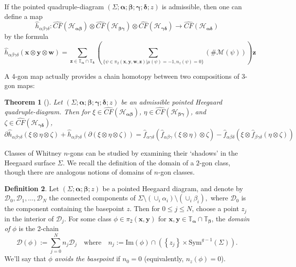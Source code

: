 \documentclass[11pt]{article}
\theoremstyle{plain} \newtheorem{thm}{Theorem}[subsection]
\theoremstyle{plain} \newtheorem{cor}[thm]{Corollary}
\theoremstyle{plain} \newtheorem{prop}[thm]{Proposition}
\theoremstyle{plain} \newtheorem{conj}[thm]{Conjecture}
\theoremstyle{plain} \newtheorem{lem}[thm]{Lemma}
\theoremstyle{definition} \newtheorem{df}[thm]{Definition}
\theoremstyle{remark} \newtheorem{rmk}[thm]{Remark}
\theoremstyle{remark} \newtheorem{obs}[thm]{Observation}
\newcommand{\h}{\mathcal{H}}
\newcommand{\ba}{\boldsymbol{\alpha}}
\newcommand{\bb}{\boldsymbol{\beta}}
\newcommand{\bg}{\boldsymbol{\gamma}}
\newcommand{\bd}{\boldsymbol{\delta}}
\newcommand{\Ta}{\mathbb{T}_{\ba}}
\newcommand{\Tb}{\mathbb{T}_{\bb}}
\newcommand{\Td}{\mathbb{T}_{\bd}}
\newcommand{\bx}{\mathbf{x}}
\newcommand{\by}{\mathbf{y}}
\newcommand{\bw}{\mathbf{w}}
\newcommand{\bz}{\mathbf{z}}
\begin{document}
If the pointed quadruple-diagram $\left(\Sigma; \ba; \bb; \bg; \bd; z\right)$ is admissible, then one can define a map
\begin{equation*}
\widehat{h}_{\alpha\beta\gamma\delta}: \widehat{CF}(\h_{\ba\bb}) \otimes \widehat{CF}(\h_{\bb\bg}) \otimes \widehat{CF}(\h_{\bg\bd}) \rightarrow \widehat{CF}(\h_{\ba\bd})
\end{equation*}
by the formula
\begin{equation*}
\widehat{h}_{\alpha\beta\gamma\delta}(\bx \otimes \by \otimes \bw) =
\displaystyle\sum_{\bz \in \Ta \cap \Td} \left( \displaystyle\sum_{\{\psi \in \pi_{2}(\bx, \by, \bw, \bz)| \mu(\psi) = -1, n_{z}(\psi) = 0\}} \left(\# \mathcal{M}\left(\psi\right)\right)\right)\bz
\end{equation*}

A 4-gon map actually provides a chain homotopy between two compositions of 3-gon maps:

\begin{thm}[\cite{os:disk}]\label{thm:assoc}
Let $\left(\Sigma; \ba; \bb; \bg; \bd; z\right)$ be an admissible pointed Heegaard quadruple-diagram.  Then for $\xi \in \widehat{CF}(\h_{\ba\bb})$, $\eta \in \widehat{CF}(\h_{\bb\bg})$, and $\zeta \in \widehat{CF}(\h_{\bg\bd})$,
\begin{equation*}
\partial \widehat{h}_{\alpha\beta\gamma\delta}(\xi \otimes \eta \otimes \zeta) + \widehat{h}_{\alpha\beta\gamma\delta}(\partial(\xi \otimes \eta \otimes \zeta))
= \widehat{f}_{\alpha\gamma\delta}(\widehat{f}_{\alpha\beta\gamma}(\xi \otimes \eta) \otimes \zeta)
- \widehat{f}_{\alpha\beta\delta}(\xi \otimes \widehat{f}_{\beta\gamma\delta}(\eta \otimes \zeta))
\end{equation*}
\end{thm}

Classes of Whitney $n$-gons can be studied by examining their `shadows' in the Heegaard surface $\Sigma$.  We recall the definition of the domain of a $2$-gon class, though there are analogous notions of domains of $n$-gon classes.

\begin{df}
Let $\left( \Sigma; \ba ; \bb; z \right)$ be a pointed Heegaard diagram, and denote by $\mathcal{D}_0, \mathcal{D}_1, \ldots, \mathcal{D}_N$ the connected components of $\Sigma \setminus \left( \cup_i \alpha_i\right) \setminus \left( \cup_i \beta_i \right),$ where $\mathcal{D}_0$ is the component containing the basepoint $z$.  Then for $0 \leq j \leq N$, choose a point $z_j$ in the interior of $\mathcal{D}_j$.  For some class $\phi \in \pi_2(\bx, \by)$ for $\bx, \by \in \Ta \cap \Tb$, the \textit{domain of $\phi$}  is the 2-chain
$$\mathcal{D}(\phi):= \sum_{j = 0}^{N} n_j \mathcal{D}_j \quad \text{where} \quad n_j:= \text{Im}(\phi) \cap \left(\left \{ z_j \right\} \times \text{Sym}^{g-1}(\Sigma) \right).$$
We'll say that $\phi$ \textit{avoids the basepoint} if $n_0 = 0$ (equivalently, $n_z(\phi) = 0$).
\end{df}
\end{document}
